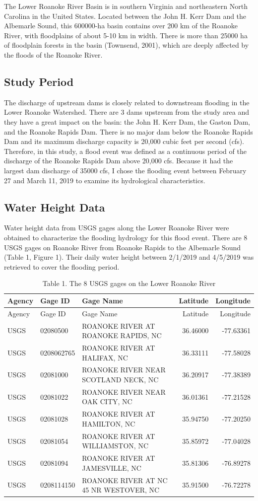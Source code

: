 \documentclass[12pt,]{article}
\begin{document}
The Lower Roanoke River Basin is in southern Virginia and northeastern
North Carolina in the United States. Located between the John H. Kerr
Dam and the Albemarle Sound, this 600000-ha basin contains over 200 km
of the Roanoke River, with floodplains of about 5-10 km in width. There
is more than 25000 ha of floodplain forests in the basin (Townsend,
2001), which are deeply affected by the floods of the Roanoke River.

\subsection{Study Period}\label{study-period}

The discharge of upstream dams is closely related to downstream flooding
in the Lower Roanoke Watershed. There are 3 dams upstream from the study
area and they have a great impact on the basin: the John H. Kerr Dam,
the Gaston Dam, and the Roanoke Rapids Dam. There is no major dam below
the Roanoke Rapids Dam and its maximum discharge capacity is 20,000
cubic feet per second (cfs). Therefore, in this study, a flood event was
defined as a continuous period of the discharge of the Roanoke Rapids
Dam above 20,000 cfs. Because it had the largest dam discharge of 35000
cfs, I chose the flooding event between February 27 and March 11, 2019
to examine its hydrological characteristics.

\subsection{Water Height Data}\label{water-height-data}

Water height data from USGS gages along the Lower Roanoke River were
obtained to characterize the flooding hydrology for this flood event.
There are 8 USGS gages on Roanoke River from Roanoke Rapids to the
Albemarle Sound (Table 1, Figure 1). Their daily water height between
2/1/2019 and 4/5/2019 was retrieved to cover the flooding period.

\begin{longtable}[]{@{}lllrr@{}}
\caption{Table 1. The 8 USGS gages on the Lower Roanoke
River}\tabularnewline
\toprule
Agency & Gage ID & Gage Name & Latitude & Longitude\tabularnewline
\midrule
\endfirsthead
\toprule
Agency & Gage ID & Gage Name & Latitude & Longitude\tabularnewline
\midrule
\endhead
USGS & 02080500 & ROANOKE RIVER AT ROANOKE RAPIDS, NC & 36.46000 &
-77.63361\tabularnewline
USGS & 0208062765 & ROANOKE RIVER AT HALIFAX, NC & 36.33111 &
-77.58028\tabularnewline
USGS & 02081000 & ROANOKE RIVER NEAR SCOTLAND NECK, NC & 36.20917 &
-77.38389\tabularnewline
USGS & 02081022 & ROANOKE RIVER NEAR OAK CITY, NC & 36.01361 &
-77.21528\tabularnewline
USGS & 02081028 & ROANOKE RIVER AT HAMILTON, NC & 35.94750 &
-77.20250\tabularnewline
USGS & 02081054 & ROANOKE RIVER AT WILLIAMSTON, NC & 35.85972 &
-77.04028\tabularnewline
USGS & 02081094 & ROANOKE RIVER AT JAMESVILLE, NC & 35.81306 &
-76.89278\tabularnewline
USGS & 0208114150 & ROANOKE RIVER AT NC 45 NR WESTOVER, NC & 35.91500 &
-76.72278\tabularnewline
\bottomrule
\end{longtable}
\end{document}
